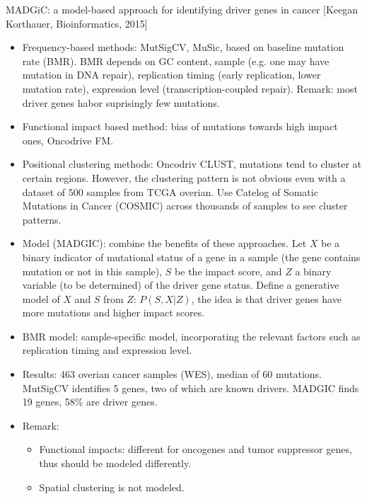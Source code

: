\documentclass{report}
\begin{document}
MADGiC: a model-based approach for identifying driver genes in cancer [Keegan Korthauer, Bioinformatics, 2015]
\begin{itemize}
	\item Frequency-based methods: MutSigCV, MuSic, based on baseline mutation rate (BMR). BMR depends on GC content, sample (e.g. one may have mutation in DNA repair), replication timing (early replication, lower mutation rate), expression level (transcription-coupled repair). Remark: most driver genes habor suprisingly few mutations. 
	
	\item Functional impact based method: bias of mutations towards high impact ones, Oncodrive FM. 
	
	\item Positional clustering methods: Oncodriv CLUST, mutations tend to cluster at certain regions. However, the clustering pattern is not obvious even with a dataset of 500 samples from TCGA overian. Use Catelog of Somatic Mutations in Cancer (COSMIC) across thousands of samples to see cluster patterns. 
	
	\item Model (MADGIC): combine the benefits of these approaches. Let $X$ be a binary indicator of mutational status of a gene in a sample (the gene contains mutation or not in this sample), $S$ be the impact score, and $Z$ a binary variable (to be determined) of the driver gene status. Define a generative model of $X$ and $S$ from $Z$: $P(S,X|Z)$, the idea is that driver genes have more mutations and higher impact scores. 
	
	\item BMR model: sample-specific model, incorporating the relevant factors such as replication timing and expression level. 
	
	\item Results: 463 overian cancer samples (WES), median of 60 mutations. MutSigCV identifies 5 genes, two of which are known drivers. MADGIC finds 19 genes, 58\% are driver genes.  
	
	\item Remark: 
	\begin{itemize}
		\item Functional impacts: different for oncogenes and tumor suppressor genes, thus should be modeled differently. 
		\item Spatial clustering is not modeled. 
	\end{itemize}
\end{itemize}
\end{document}
